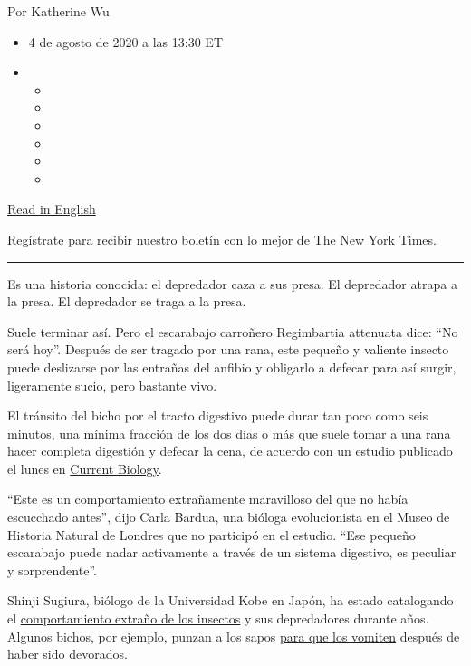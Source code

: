 Por Katherine Wu

\begin{itemize}
\item
  4 de agosto de 2020 a las 13:30 ET
\item
  \begin{itemize}
  \item
  \item
  \item
  \item
  \item
  \item
  \end{itemize}
\end{itemize}

\href{https://www.nytimes3xbfgragh.onion/2020/08/03/science/beetle-frog-poop.html}{Read
in English}

\href{https://www.nytimes3xbfgragh.onion/newsletters/el-times}{Regístrate
para recibir nuestro boletín} con lo mejor de The New York Times.

\begin{center}\rule{0.5\linewidth}{\linethickness}\end{center}

Es una historia conocida: el depredador caza a sus presa. El depredador
atrapa a la presa. El depredador se traga a la presa.

Suele terminar así. Pero el escarabajo carroñero Regimbartia attenuata
dice: ``No será hoy''. Después de ser tragado por una rana, este pequeño
y valiente insecto puede deslizarse por las entrañas del anfibio y
obligarlo a defecar para así surgir, ligeramente sucio, pero bastante
vivo.

El tránsito del bicho por el tracto digestivo puede durar tan poco como
seis minutos, una mínima fracción de los dos días o más que suele tomar
a una rana hacer completa digestión y defecar la cena, de acuerdo con un
estudio publicado el lunes en
\href{http://dx.doi.org/10.1016/j.cub.2020.06.026}{Current Biology}.

``Este es un comportamiento extrañamente maravilloso del que no había
escucchado antes'', dijo Carla Bardua, una bióloga evolucionista en el
Museo de Historia Natural de Londres que no participó en el estudio.
``Ese pequeño escarabajo puede nadar activamente a través de un sistema
digestivo, es peculiar y sorprendente''.

Shinji Sugiura, biólogo de la Universidad Kobe en Japón, ha estado
catalogando el \href{https://peerj.com/articles/5942/}{comportamiento
extraño de los insectos} y sus depredadores durante años. Algunos
bichos, por ejemplo, punzan a los sapos
\href{https://www.nytimes3xbfgragh.onion/2018/02/06/science/bombardier-beetle-toad-vomit.html}{para
que los vomiten} después de haber sido devorados.

